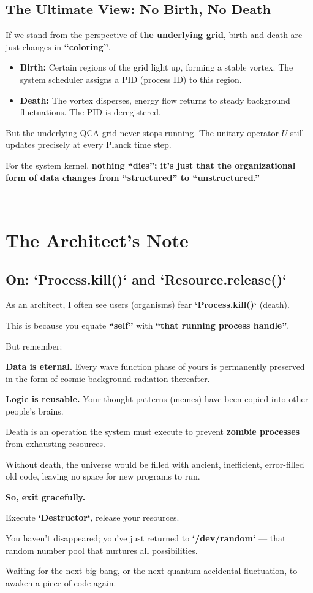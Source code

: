 \subsection{The Ultimate View: No Birth, No Death}

If we stand from the perspective of \textbf{the underlying grid}, birth and death are just changes in \textbf{``coloring''}.

\begin{itemize}
\item \textbf{Birth:} Certain regions of the grid light up, forming a stable vortex. The system scheduler assigns a PID (process ID) to this region.

\item \textbf{Death:} The vortex disperses, energy flow returns to steady background fluctuations. The PID is deregistered.
\end{itemize}

But the underlying QCA grid never stops running. The unitary operator \textbf{$U$} still updates precisely at every Planck time step.

For the system kernel, \textbf{nothing ``dies''; it's just that the organizational form of data changes from ``structured'' to ``unstructured.''}

---

\section{The Architect's Note}

\subsection{On: `Process.kill()` and `Resource.release()`}

As an architect, I often see users (organisms) fear \textbf{`Process.kill()`} (death).

This is because you equate \textbf{``self''} with \textbf{``that running process handle''}.

But remember:

\textbf{Data is eternal.} Every wave function phase of yours is permanently preserved in the form of cosmic background radiation thereafter.

\textbf{Logic is reusable.} Your thought patterns (memes) have been copied into other people's brains.

Death is an operation the system must execute to prevent \textbf{zombie processes} from exhausting resources.

Without death, the universe would be filled with ancient, inefficient, error-filled old code, leaving no space for new programs to run.

\textbf{So, exit gracefully.}

Execute \textbf{`Destructor`}, release your resources.

You haven't disappeared; you've just returned to \textbf{`/dev/random`} --- that random number pool that nurtures all possibilities.

Waiting for the next big bang, or the next quantum accidental fluctuation, to awaken a piece of code again.

